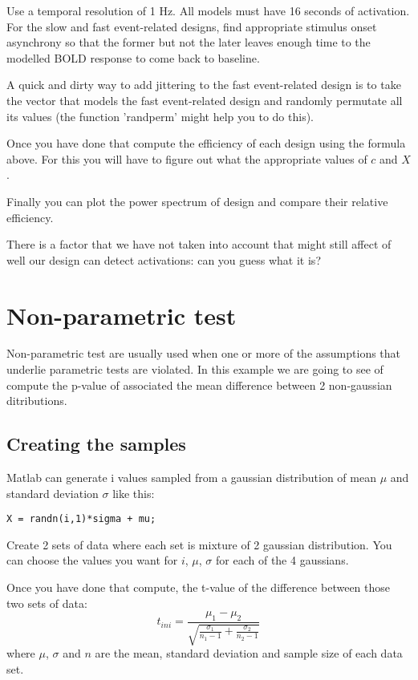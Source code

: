 \documentclass[a4paper,10pt]{article}
\begin{document}
Use a temporal resolution of 1 Hz. All models must have 16 seconds of activation. For the slow and fast event-related designs, find appropriate stimulus onset asynchrony so that the former but not the later leaves enough time to the modelled BOLD response to come back to baseline.

A quick and dirty way to add jittering to the fast event-related design is to take the vector that models the fast event-related design and randomly permutate all its values (the function 'randperm' might help you to do this).

Once you have done that compute the efficiency of each design using the formula above. For this you will have to figure out what the appropriate values of $c$ and $X$.

Finally you can plot the power spectrum of design and compare their relative efficiency.

There is a factor that we have not taken into account that might still affect of well our design can detect activations: can you guess what it is?



\section{Non-parametric test}

Non-parametric test are usually used when one or more of the assumptions that underlie parametric tests are violated. In this example we are going to see of compute the p-value of associated the mean difference between 2 non-gaussian ditributions.


\subsection{Creating the samples}

Matlab can generate i values sampled from a gaussian distribution of mean $\mu$ and standard deviation $\sigma$ like this:
\begin{verbatim}
X = randn(i,1)*sigma + mu;
\end{verbatim}

Create 2 sets of data where each set is mixture of 2 gaussian distribution. You can choose the values you want for $i$, $\mu$, $\sigma$ for each of the 4 gaussians.

Once you have done that compute, the t-value of the difference between those two sets of data:
\begin{displaymath}
t_{ini} = \frac{\mu_{1} - \mu_{2}} {\sqrt{ \frac{\sigma_{1}} {n_{1}-1} + \frac{\sigma_{2}} {n_{2}-1} }}
\end{displaymath}
where $\mu$, $\sigma$ and $n$ are the mean, standard deviation and sample size of each data set.
\end{document}
